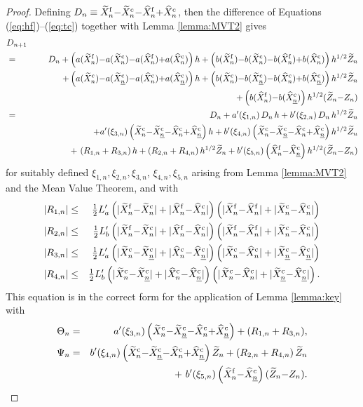 \documentclass[11pt]{article}
\def \tZ {{\widetilde{Z}}}
\def \tXfn {{\widetilde{X}^{\rm f}_n}}
\def \tXcn {{\widetilde{X}^{\rm c}_n}}
\def \tXcl {{\widetilde{X}^{\rm c}_{\underline{n}}}}
\def \hXfn {{\widehat{X}^{\rm f}_n}}
\def \hXcn {{\widehat{X}^{\rm c}_n}}
\def \hXcl {{\widehat{X}^{\rm c}_{\underline{n}}}}
\newcommand{\fracs}[2]{{\textstyle \frac{#1}{#2}}}
\begin{document}
\begin{proof}
Defining $D_n \equiv \tXfn{-}\tXcn {-} \hXfn{+}\hXcn$, 
then the difference of Equations (\ref{eq:hf})--(\ref{eq:tc}) 
together with Lemma \ref{lemma:MVT2} gives
\begin{eqnarray*}
\lefteqn{D_{n+1}}
\\ &=& D_n
+ \left( a(\tXfn) {-} a(\tXcn) {-} a(\hXfn) {+} a(\hXcn) \right) h
+ \left( b(\tXfn) {-} b(\tXcn) {-} b(\hXfn) {+} b(\hXcn) \right) h^{1/2} \tZ_n
\\ && ~~~~
+ \left( a(\tXcn) {-} a(\tXcl) {-} a(\hXcn) {+} a(\hXcl) \right) h
+ \left( b(\tXcn) {-} b(\tXcl) {-} b(\hXcn) {+} b(\hXcl) \right) h^{1/2} \tZ_n
\\ && \hspace{3.4in}
+ \left( b(\hXfn) {-} b(\hXcl) \right) h^{1/2} (\tZ_n {-} Z_n)
\\ &=& D_n
+ a'(\xi_{1,n})\, D_n\, h
+ b'(\xi_{2,n})\, D_n\, h^{1/2} \tZ_n
\\ && ~~~~
+ a'(\xi_{3,n}) \left( \tXcn {-} \tXcl {-} \hXcn {+} \hXcl \right) h
+ b'(\xi_{4,n}) \left( \tXcn {-} \tXcl {-} \hXcn {+} \hXcl \right) h^{1/2} \tZ_n
\\ && ~~~~ +\ (R_{1,n} +  R_{3,n})\, h + (R_{2,n} + R_{4,n})\, h^{1/2} \tZ_n
+ b'(\xi_{5,n}) \left( \hXfn {-} \hXcl \right) h^{1/2} (\tZ_n {-} Z_n)
\end{eqnarray*}
for suitably defined $\xi_{1,n}, \xi_{2,n}, \xi_{3,n}$, $\xi_{4,n}, \xi_{5,n}$ 
arising from Lemma \ref{lemma:MVT2} and the Mean Value Theorem, and with
\begin{eqnarray*}
|R_{1,n}| &\leq& \fracs{1}{2} L'_a
 \left( |\tXfn {-} \tXcn| + |\hXfn {-} \hXcn| \right)
 \left( |\tXfn {-} \hXfn| + |\tXcn {-} \hXcn| \right) \\
|R_{2,n}| &\leq& \fracs{1}{2} L'_b
 \left( |\tXfn {-} \tXcn| + |\hXfn {-} \hXcn| \right)
 \left( |\tXfn {-} \hXfn| + |\tXcn {-} \hXcn| \right) \\
|R_{3,n}| &\leq& \fracs{1}{2} L'_a
 \left( |\tXcn {-} \tXcl| + |\hXcn {-} \hXcl| \right)
 \left( |\tXcn {-} \hXcn| + |\tXcl {-} \hXcl| \right) \\
|R_{4,n}| &\leq& \fracs{1}{2} L'_b
 \left( |\tXcn {-} \tXcl| + |\hXcn {-} \hXcl| \right)
 \left( |\tXcn {-} \hXcn| + |\tXcl {-} \hXcl| \right).
\end{eqnarray*}
This equation is in the correct form for the application of Lemma \ref{lemma:key}
with
\begin{eqnarray*}
  \Theta_n &=&   a'(\xi_{3,n}) \left( \tXcn {-} \tXcl {-} \hXcn {+} \hXcl \right)
+ (R_{1,n} +  R_{3,n}), \\
  \Psi_n &=&  b'(\xi_{4,n}) \left( \tXcn {-} \tXcl {-} \hXcn {+} \hXcl \right) \tZ_n
+ (R_{2,n} + R_{4,n})\, \tZ_n\\
&& +\ b'(\xi_{5,n}) \left( \hXfn {-} \hXcl \right) (\tZ_n {-} Z_n).
\end{eqnarray*}


\end{proof}
\end{document}
